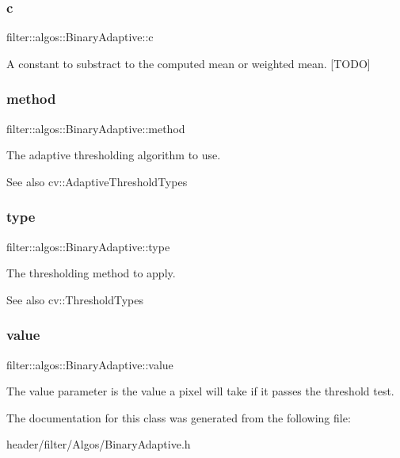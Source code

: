 \subsubsection{\texorpdfstring{c}{c}}
{\footnotesize\ttfamily filter\+::algos\+::\+Binary\+Adaptive\+::c}

A constant to substract to the computed mean or weighted mean. \mbox{[}T\+O\+DO\mbox{]} \mbox{\label{classfilter_1_1algos_1_1_binary_adaptive_a67df7719f9d5ace093fb1b70455f7a4f}} 
\subsubsection{\texorpdfstring{method}{method}}
{\footnotesize\ttfamily filter\+::algos\+::\+Binary\+Adaptive\+::method}

The adaptive thresholding algorithm to use. \begin{DoxySeeAlso}{See also}
cv\+::\+Adaptive\+Threshold\+Types 
\end{DoxySeeAlso}
\mbox{\label{classfilter_1_1algos_1_1_binary_adaptive_a8256a8c340fbc64eaf1fa4232d910435}} 
\subsubsection{\texorpdfstring{type}{type}}
{\footnotesize\ttfamily filter\+::algos\+::\+Binary\+Adaptive\+::type}

The thresholding method to apply. \begin{DoxySeeAlso}{See also}
cv\+::\+Threshold\+Types 
\end{DoxySeeAlso}
\mbox{\label{classfilter_1_1algos_1_1_binary_adaptive_ae61f0f9c3449d7025d88508445005cc7}} 
\subsubsection{\texorpdfstring{value}{value}}
{\footnotesize\ttfamily filter\+::algos\+::\+Binary\+Adaptive\+::value}

The value parameter is the value a pixel will take if it passes the threshold test. 

The documentation for this class was generated from the following file\+:\begin{DoxyCompactItemize}
\item 
header/filter/\+Algos/Binary\+Adaptive.\+h\end{DoxyCompactItemize}
